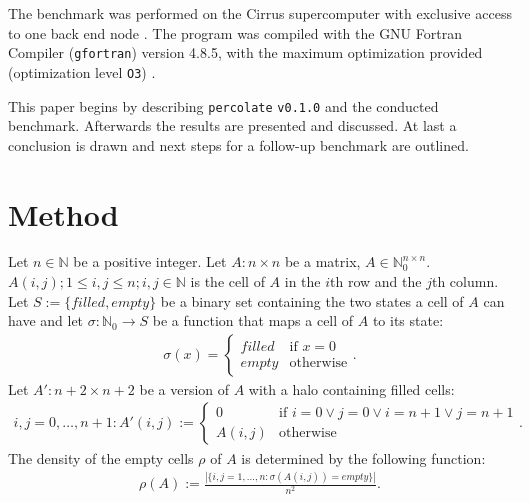 \documentclass[twoside,11pt]{article}
\def\perc{\texttt{perco\-late}}
\def\v{\texttt{v0.1.0}}
\begin{document}
The benchmark was performed on the Cirrus supercomputer
with exclusive access to one back end node
\citep[see][]{cirrus}.
The program was compiled with the GNU Fortran Compiler
(\texttt{gfortran}) version 4.8.5, with the maximum
optimization provided (optimization level \texttt{O3})
\citep[see][]{gfortran}.

This paper begins by describing \perc{} \v{} and the
conducted benchmark.
Afterwards the results are presented and discussed.
At last a conclusion is drawn and next steps for a
follow-up benchmark are outlined.

\section{Method} %

Let $n \in \mathbb{N}$ be a positive integer.
Let $A: n \times n$ be a matrix,
$A \in \mathbb{N}_{0}^{n \times n}$.
$A(i, j); 1 \leq i, j \leq n; i, j \in \mathbb{N}$ is
the cell of $A$ in the $i$th row and the $j$th column.
Let $S := \{filled, empty\}$ be a binary set containing the
two states a cell of $A$ can have and let $\sigma:
\mathbb{N}_0 \rightarrow S$ be a function that
maps a cell of $A$ to its state:
\begin{align*}
\sigma(x) = \begin{cases}
  filled &\text{if } x = 0 \\
  empty  &\text{otherwise}
\end{cases}.
\end{align*}
Let $A': n+2 \times n+2$ be a version of $A$ with a halo
containing filled cells:
\begin{align}
  \label{eq:a'}
i,j = 0, \dots, n+1: A'(i, j) := \begin{cases}
  0 &\text{if } i=0 \lor j=0 \lor i=n+1 \lor j=n+1 \\
  A(i, j) &\text{otherwise}
\end{cases}.
\end{align}
The density of the empty cells $\rho$ of $A$ is determined
by the following function:
\begin{align*}
\rho(A) := \frac{|\{i,j=1,\dots,n: \sigma(A(i,j)) = empty\}|}{n^2}.
\end{align*}
\end{document}
